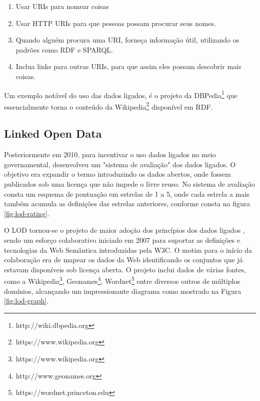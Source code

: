 \begin{enumerate}
	\item{Usar URIs para nomear coisas}
	\item{Usar \ac{HTTP} URIs para que pessoas possam procurar seus nomes.}
	\item{Quando alguém procura uma URI, forneça informação útil, utilizando os padrões como RDF e SPARQL.}
	\item{Inclua links para outras URIs, para que assim eles possam descobrir mais coisas.}
\end{enumerate}

Um exemplo notável do uso das dados ligados, é o projeto da DBPedia\footnote{ http://wiki.dbpedia.org} que essencialmente torna o conteúdo da Wikipedia\footnote{https://www.wikipedia.org} disponível em RDF.

\subsection{Linked Open Data}

Posteriormente em 2010, para incentivar o uso dados ligados no meio governamental, \cite{LinkedData:2006} desenvolveu um "sistema de avaliação" dos dados ligados. O objetivo era expandir o termo introduzindo os dados abertos, onde fossem publicados sob uma licença que não impede o livre reuso. No sistema de avaliação consta um esquema de pontuação em estrelas de 1 a 5, onde cada estrela a mais também acumula as definições das estrelas anteriores, conforme consta na figura \ref{fig:lod-rating}.

O \ac{LOD} tornou-se o projeto de maior adoção dos princípios dos dados ligados \citep{Bizer2009}, sendo um esforço colaborativo iniciado em 2007 para suportar as definições e tecnologias da Web Semântica introduzidas pela W3C. O motim para o início da colaboração era de mapear os dados da Web identificando os conjuntos que já estavam disponíveis sob licença aberta. O projeto inclui dados de várias fontes, como a Wikipedia\footnote{https://www.wikipedia.org}, Geonames\footnote{http://www.geonames.org}, Wordnet\footnote{https://wordnet.princeton.edu} entre diversos outros de múltiplos domínios, alcançando um impressionante diagrama como mostrado na Figura \ref{fig:lod-graph}.

